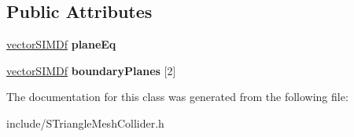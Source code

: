 \subsection*{Public Attributes}
\begin{DoxyCompactItemize}
\item 
\hyperlink{classirr_1_1core_1_1vectorSIMDf}{vector\+S\+I\+M\+Df} {\bfseries plane\+Eq}\hypertarget{classirr_1_1core_1_1STriangleCollider_a0f5968aeb67f5c8a1466838154c359c6}{}\label{classirr_1_1core_1_1STriangleCollider_a0f5968aeb67f5c8a1466838154c359c6}

\item 
\hyperlink{classirr_1_1core_1_1vectorSIMDf}{vector\+S\+I\+M\+Df} {\bfseries boundary\+Planes} \mbox{[}2\mbox{]}\hypertarget{classirr_1_1core_1_1STriangleCollider_ae62a4bc6ed4e5c602fc246fb9f09c31d}{}\label{classirr_1_1core_1_1STriangleCollider_ae62a4bc6ed4e5c602fc246fb9f09c31d}

\end{DoxyCompactItemize}


The documentation for this class was generated from the following file\+:\begin{DoxyCompactItemize}
\item 
include/S\+Triangle\+Mesh\+Collider.\+h\end{DoxyCompactItemize}
